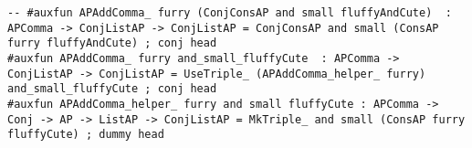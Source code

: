 \begin{lstlisting}
-- #auxfun APAddComma_ furry (ConjConsAP and small fluffyAndCute)  : APComma -> ConjListAP -> ConjListAP = ConjConsAP and small (ConsAP furry fluffyAndCute) ; conj head
#auxfun APAddComma_ furry and_small_fluffyCute  : APComma -> ConjListAP -> ConjListAP = UseTriple_ (APAddComma_helper_ furry) and_small_fluffyCute ; conj head
#auxfun APAddComma_helper_ furry and small fluffyCute : APComma -> Conj -> AP -> ListAP -> ConjListAP = MkTriple_ and small (ConsAP furry fluffyCute) ; dummy head

\end{lstlisting}